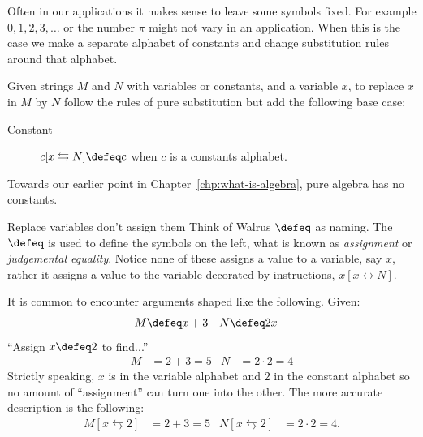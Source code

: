 Often in our applications it makes sense to leave some symbols fixed.
For example $0,1,2,3,\ldots$ or the number $\pi$ might not vary in an application.
When this is the case we make a separate alphabet of constants and change substitution 
rules around that alphabet.
\begin{definition}
    Given strings $M$ and $N$ with variables or constants, 
    and a variable $x$, to replace $x$ in $M$ by $N$ 
    follow the rules of pure substitution but add the following  base case:
    \begin{description}
        \item[Constant] $c[x\leftrightarrows N]\defeq c$ when $c$ is a constants alphabet. 
    \end{description}
\end{definition}

Towards our earlier point in Chapter~\ref{chp:what-is-algebra}, pure algebra has no constants.

\begin{remark}{Replace variables don't assign them}
    Think of Walrus $\defeq$ as  naming.
    The $\defeq$ is used to define the symbols on the left, what is 
    known as \emph{assignment} or \emph{judgemental equality}.  Notice none of 
    these assigns a value to a variable, say $x$, rather it assigns a value to the variable 
    decorated by instructions, $x[x\leftrightarrow N]$.  
    
    It is common to encounter arguments shaped like the following.  Given:
    \begin{align*}
        M & \defeq x+3 & N & \defeq 2x
    \end{align*}
    ``Assign $x \defeq 2$ to find...''
    \begin{align*}
        M  & = 2+3 =5 & N & = 2\cdot 2 =4
    \end{align*}
    Strictly speaking, $x$ is in the variable alphabet and $2$ in the constant 
    alphabet so no amount of ``assignment'' can turn one into the other.
    The more accurate description is the following:
    \begin{align*}
        M[x\leftrightarrows 2] & = 2+3=5 & N[x\leftrightarrows 2] & = 2\cdot 2=4.
    \end{align*}
\end{remark}

